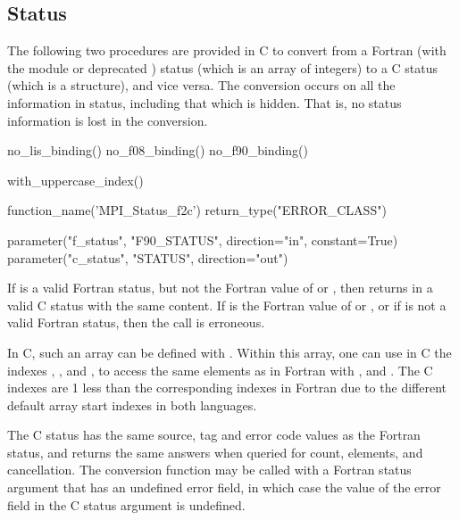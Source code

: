 \subsection{Status}
\label{sec:conversion:status}

The following two procedures are provided in C to convert from a
Fortran (with the  module or deprecated )
status (which is an array of integers) to a C status (which is
a structure), and vice versa.
The conversion occurs on all the information in status, including that which
is hidden.  That is, no status information is lost in the conversion.

%
\begin{mpi-binding}
    no_lis_binding()
    no_f08_binding()
    no_f90_binding()

    with_uppercase_index()

    function_name('MPI_Status_f2c')
    return_type("ERROR_CLASS")

    parameter("f_status", "F90_STATUS", direction="in", constant=True)
    parameter("c_status", "STATUS", direction="out")
\end{mpi-binding}

If  is a valid Fortran status, but not the Fortran value of
 or , then
 returns in  a valid C status with
the same content.  If  is the Fortran value of
 or , or if
 is not a valid Fortran status, then the call is erroneous.

\label{sec:conversion:status:C_F_constants}
In C, such an  array can be defined with . Within this array, one can use in
C the indexes , , and
, to access the same elements as in Fortran with
,  and . The C indexes are
1 less than the corresponding indexes in Fortran due to the different default array
start indexes in both languages.

The C status has the same source, tag and error code values as the
Fortran status, and returns the same answers when queried for count,
elements, and cancellation.
The conversion function may be called with a Fortran status argument that
has
an undefined error field, in which case the value of the error field
in the C status argument is undefined.

